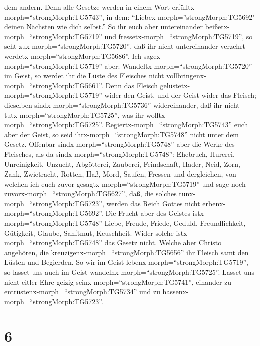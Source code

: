 dem andern.  Denn alle Gesetze werden in einem Wort
erfülltx-morph=``strongMorph:TG5743'', in dem:
``Liebex-morph=''strongMorph:TG5692" deinen Nächsten wie dich selbst.''
 So ihr euch aber untereinander
beißetx-morph=``strongMorph:TG5719'' und
fressetx-morph=``strongMorph:TG5719'', so seht
zux-morph=``strongMorph:TG5720'', daß ihr nicht untereinander verzehrt
werdetx-morph=``strongMorph:TG5686''.  Ich
sagex-morph=``strongMorph:TG5719'' aber:
Wandeltx-morph=``strongMorph:TG5720'' im Geist, so werdet ihr die Lüste
des Fleisches nicht vollbringenx-morph=``strongMorph:TG5661''.
 Denn das Fleisch gelüstetx-morph=``strongMorph:TG5719''
wider den Geist, und der Geist wider das Fleisch; dieselben
sindx-morph=``strongMorph:TG5736'' widereinander, daß ihr nicht
tutx-morph=``strongMorph:TG5725'', was ihr
wolltx-morph=``strongMorph:TG5725''. 
Regiertx-morph=``strongMorph:TG5743'' euch aber der Geist, so seid
ihrx-morph=``strongMorph:TG5748'' nicht unter dem Gesetz. 
Offenbar sindx-morph=``strongMorph:TG5748'' aber die Werke des
Fleisches, als da sindx-morph=``strongMorph:TG5748'': Ehebruch, Hurerei,
Unreinigkeit, Unzucht,  Abgötterei, Zauberei, Feindschaft,
Hader, Neid, Zorn, Zank, Zwietracht, Rotten, Haß, Mord, 
Saufen, Fressen und dergleichen, von welchen ich euch zuvor
gesagtx-morph=``strongMorph:TG5719'' und sage noch
zuvorx-morph=``strongMorph:TG5627'', daß, die solches
tunx-morph=``strongMorph:TG5723'', werden das Reich Gottes nicht
erbenx-morph=``strongMorph:TG5692''.  Die Frucht aber des
Geistes istx-morph=``strongMorph:TG5748'' Liebe, Freude, Friede, Geduld,
Freundlichkeit, Gütigkeit, Glaube, Sanftmut, Keuschheit. 
Wider solche istx-morph=``strongMorph:TG5748'' das Gesetz nicht.
 Welche aber Christo angehören, die
kreuzigenx-morph=``strongMorph:TG5656'' ihr Fleisch samt den Lüsten und
Begierden.  So wir im Geist
lebenx-morph=``strongMorph:TG5719'', so lasset uns auch im Geist
wandelnx-morph=``strongMorph:TG5725''.  Lasset uns nicht
eitler Ehre geizig seinx-morph=``strongMorph:TG5741'', einander zu
entrüstenx-morph=``strongMorph:TG5734'' und zu
hassenx-morph=``strongMorph:TG5723''.

\hypertarget{section-5}{%
\section{6}\label{section-5}}

